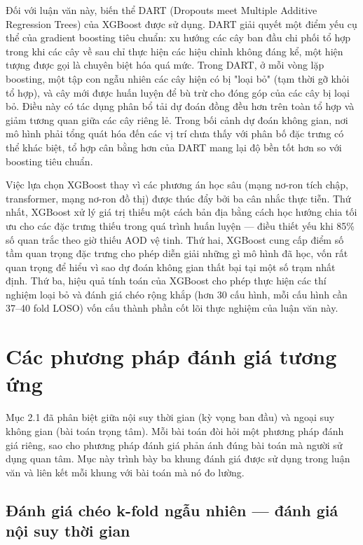 Đối với luận văn này, biến thể DART (Dropouts meet Multiple Additive Regression Trees) của XGBoost được sử dụng. DART giải quyết một điểm yếu cụ thể của gradient boosting tiêu chuẩn: xu hướng các cây ban đầu chi phối tổ hợp trong khi các cây về sau chỉ thực hiện các hiệu chỉnh không đáng kể, một hiện tượng được gọi là chuyên biệt hóa quá mức. Trong DART, ở mỗi vòng lặp boosting, một tập con ngẫu nhiên các cây hiện có bị "loại bỏ" (tạm thời gỡ khỏi tổ hợp), và cây mới được huấn luyện để bù trừ cho đóng góp của các cây bị loại bỏ. Điều này có tác dụng phân bổ tải dự đoán đồng đều hơn trên toàn tổ hợp và giảm tương quan giữa các cây riêng lẻ. Trong bối cảnh dự đoán không gian, nơi mô hình phải tổng quát hóa đến các vị trí chưa thấy với phân bố đặc trưng có thể khác biệt, tổ hợp cân bằng hơn của DART mang lại độ bền tốt hơn so với boosting tiêu chuẩn.

Việc lựa chọn XGBoost thay vì các phương án học sâu (mạng nơ-ron tích chập, transformer, mạng nơ-ron đồ thị) được thúc đẩy bởi ba cân nhắc thực tiễn. Thứ nhất, XGBoost xử lý giá trị thiếu một cách bản địa bằng cách học hướng chia tối ưu cho các đặc trưng thiếu trong quá trình huấn luyện --- điều thiết yếu khi 85\% số quan trắc theo giờ thiếu AOD vệ tinh. Thứ hai, XGBoost cung cấp điểm số tầm quan trọng đặc trưng cho phép diễn giải những gì mô hình đã học, vốn rất quan trọng để hiểu vì sao dự đoán không gian thất bại tại một số trạm nhất định. Thứ ba, hiệu quả tính toán của XGBoost cho phép thực hiện các thí nghiệm loại bỏ và đánh giá chéo rộng khắp (hơn 30 cấu hình, mỗi cấu hình cần 37--40 fold LOSO) vốn cấu thành phần cốt lõi thực nghiệm của luận văn này.


\section{Các phương pháp đánh giá tương ứng}

Mục 2.1 đã phân biệt giữa nội suy thời gian (kỳ vọng ban đầu) và ngoại suy không gian (bài toán trọng tâm). Mỗi bài toán đòi hỏi một phương pháp đánh giá riêng, sao cho phương pháp đánh giá phản ánh đúng bài toán mà người sử dụng quan tâm. Mục này trình bày ba khung đánh giá được sử dụng trong luận văn và liên kết mỗi khung với bài toán mà nó đo lường.

\subsection{Đánh giá chéo k-fold ngẫu nhiên --- đánh giá nội suy thời gian}


